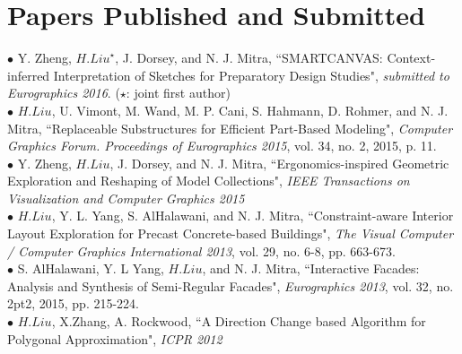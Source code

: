 

%
\chapter*{\thechapter \quad Papers Published and Submitted}
\label{papers}


$\bullet$ Y. Zheng, ${H. Liu}^\star$, J. Dorsey, and N. J. Mitra, {``SMARTCANVAS: Context-inferred Interpretation of Sketches for Preparatory Design Studies"}, \emph{submitted to Eurographics 2016}. ($\star$: joint first author)\\
$\bullet$ $H. Liu$, U. Vimont, M. Wand, M. P. Cani, S. Hahmann, D. Rohmer, and N. J. Mitra, {``Replaceable Substructures for Efficient Part-Based Modeling"}, \emph{Computer Graphics Forum. Proceedings of Eurographics 2015}, vol. 34, no. 2, 2015, p. 11.\\
$\bullet$ Y. Zheng, $H. Liu$, J. Dorsey, and N. J. Mitra, {``Ergonomics-inspired Geometric Exploration and Reshaping of Model Collections"}, \emph{IEEE Transactions on Visualization and Computer Graphics 2015}\\
$\bullet$ $H. Liu$, Y. L. Yang, S. AlHalawani, and N. J. Mitra, {``Constraint-aware Interior Layout Exploration for Precast Concrete-based Buildings"}, \emph{The Visual Computer / Computer Graphics International 2013}, vol. 29, no. 6-8, pp. 663-673.\\
$\bullet$ S. AlHalawani, Y. L Yang,  $H. Liu$,  and N. J. Mitra, {``Interactive Facades: Analysis and Synthesis of Semi-Regular Facades"}, \emph{Eurographics 2013}, vol. 32, no. 2pt2, 2015, pp. 215-224.\\
$\bullet$ $H. Liu$, X.Zhang, A. Rockwood, {``A Direction Change based Algorithm for Polygonal Approximation"}, \emph{ICPR 2012}




